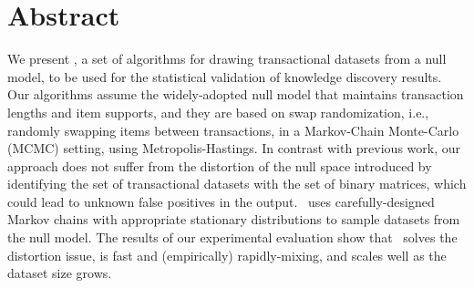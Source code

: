 \chapter*{Abstract}

We present \algo, a set of algorithms for drawing transactional datasets from
a null model, to be used for the statistical validation of knowledge discovery
results. Our algorithms assume the widely-adopted null model that maintains
transaction lengths and item supports, and they are based on swap
randomization, i.e., randomly swapping items between transactions, in a
Markov-Chain Monte-Carlo (MCMC) setting, using Metropolis-Hastings. In contrast
with previous work, our approach does not suffer from the distortion of the null
space introduced by identifying the set of transactional datasets with the set
of binary matrices, which could lead to unknown false positives in the output.
\algo\ uses carefully-designed Markov chains with appropriate stationary
distributions to sample datasets from the null model. The results of our
experimental evaluation show that \algo\ solves the distortion issue, is fast
and (empirically) rapidly-mixing, and scales well as the dataset size grows.
